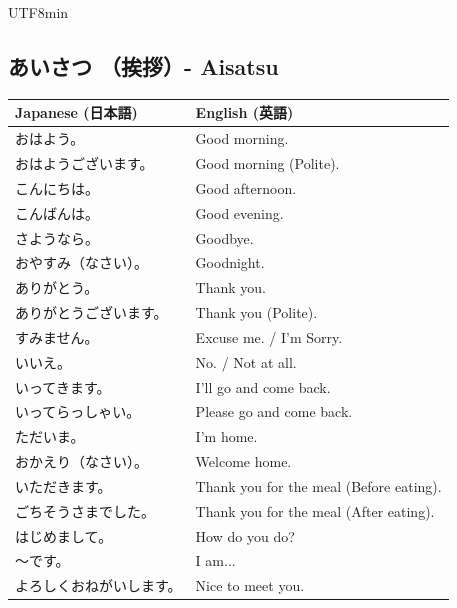 \documentclass[11pt]{article}
\begin{document}
\begin{CJK}{UTF8}{min}
\subsection{あいさつ （挨拶）- Aisatsu}
\begin{tabularx}{\textwidth}{X | X}
    \toprule
    \textbf{Japanese (日本語)} & \textbf{English (英語)} \\
    \midrule
    おはよう。 & Good morning. \\
    おはようございます。 & Good morning (Polite). \\
    こんにちは。 & Good afternoon. \\
    こんばんは。 & Good evening. \\
    さようなら。 & Goodbye. \\
    おやすみ（なさい）。 & Goodnight. \\
    ありがとう。 & Thank you. \\
    ありがとうございます。 & Thank you (Polite). \\
    すみません。 & Excuse me. / I’m Sorry. \\
    いいえ。 & No. / Not at all. \\
    いってきます。 & I’ll go and come back. \\
    いってらっしゃい。 & Please go and come back. \\
    ただいま。 & I’m home. \\
    おかえり（なさい）。 & Welcome home. \\
    いただきます。 & Thank you for the meal (Before eating). \\
    ごちそうさまでした。 & Thank you for the meal (After eating). \\
    はじめまして。 & How do you do? \\
    ～です。 & I am... \\
    よろしくおねがいします。 & Nice to meet you. \\
    \bottomrule
\end{tabularx}


\end{CJK}
\end{document}
